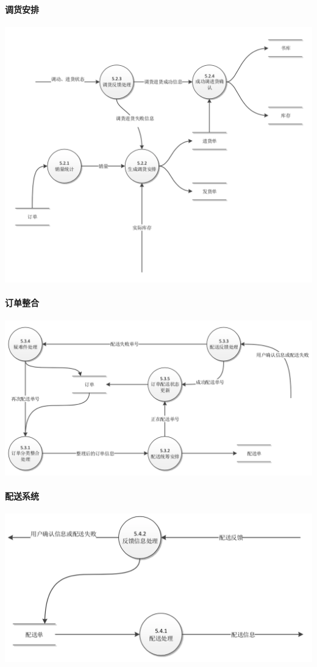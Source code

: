 \paragraph{调货安排}
\begin{center}
    \includegraphics[width=1\linewidth]{img/5.2.png}
\end{center}
\paragraph{订单整合}
\begin{center}
    \includegraphics[width=1\linewidth]{img/5.3.png}
\end{center}
\paragraph{配送系统}
\begin{center}
    \includegraphics[width=1\linewidth]{img/5.4.png}
\end{center}
